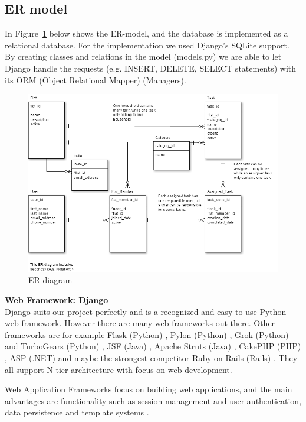 \documentclass{sig-alt-release2}
\begin{document}
\subsection{ER model}
In Figure~\ref{fig:er} below shows the ER-model, and the database is implemented
as a relational database. For the implementation we used Django's SQLite
support. By creating classes and relations in the model (models.py) we are able
to let Django handle the requests (e.g. INSERT, DELETE, SELECT statements) with
its ORM (Object Relational Mapper) (Managers).

\begin{figure}[!ht]
\centering
\includegraphics[scale=0.3]{er}
\caption{ ER diagram}
\label{fig:er}
\end{figure}

\noindent \textbf{Web Framework: Django} \\ 
Django suits our project perfectly and is a recognized and easy to use Python
web framework. However there are many web frameworks out there. Other frameworks
are for example Flask (Python) , Pylon (Python) \cite{x2}, Grok
(Python) \cite{x3} and TurboGears (Python) \cite{x4}, JSF (Java) \cite{x5},
Apache Struts (Java) \cite{x6}, CakePHP (PHP) \cite{x7}, ASP (.NET) \cite{x8}
and maybe the strongest competitor Ruby on Rails (Rails) \cite{x9} \cite{x19}.
They all support N-tier architecture with focus on web development.

Web Application Frameworks focus on building web applications, and the main
advantages are functionality such as session management and user authentication,
data persistence and template systems \cite{x10}.
\end{document}
